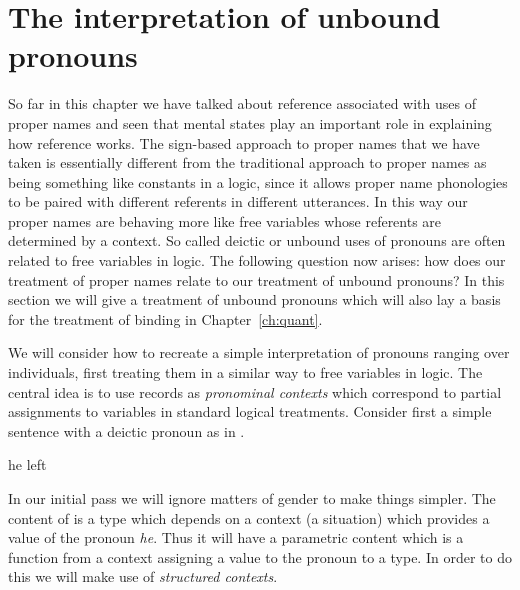 \section{The interpretation of unbound pronouns}
\label{sec:unbound}
So far in this chapter we have talked about reference associated with
uses of proper names and seen that mental states play
an important role in explaining how reference works.  The sign-based
approach to proper names that we have taken is essentially different
from the traditional approach to proper names as being something like
constants in a logic, since it allows proper name phonologies to be
paired with different referents in different utterances.  In this way
our proper names are behaving more like free variables whose referents
are determined by a context.  So called deictic or unbound uses of
pronouns are often related to free variables in logic.  The following
question now arises:  how does our treatment of proper names relate to
our treatment of unbound pronouns?  In this section we will give a
treatment of unbound pronouns which will also lay a basis for the
treatment of binding in Chapter~\ref{ch:quant}.

We will consider how to recreate a simple interpretation of pronouns
ranging over individuals, first treating them in a similar way to free
variables in logic.  The central idea is to use records as \textit{pronominal
  contexts} which correspond to partial assignments to variables in
standard logical treatments.  Consider first a simple sentence with a deictic
pronoun as in \nexteg{}.
\begin{ex} 
he left 
\end{ex} 
In our initial pass we will ignore matters
of gender to make things simpler.  The content of \preveg{} is a type
which depends on a context (a situation) which provides a value of the
pronoun \textit{he}. Thus it will have a parametric content which is a
function from a context assigning a value to the pronoun to a
type.  In order to do this we will make use of \textit{structured
  contexts}.

